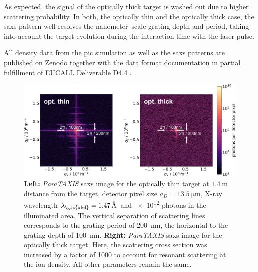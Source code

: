 As expected, the signal of the optically thick target is washed out due to
higher scattering probability. In both, the optically thin and the optically
thick case, the
\gls{saxs} pattern well resolves the nanometer--scale grating depth and period, taking
into account the target evolution during the interaction time with the laser
pulse.

All density data from the \gls{pic} simulation as well as the \gls{saxs} patterns are
published on Zenodo together with the data format documentation
\cite{Garten2017.zenodo.885033} in partial fulfillment of EUCALL Deliverable D4.4
\cite{EUCALL_SIMEX_D4.4}.

\begin{figure}
\centering
  \includegraphics[width=.99\linewidth]{figures/scattering_images_v2.png}
\caption{
\textbf{Left:} \textit{ParaTAXIS} \gls{saxs} image for the optically thin target at
$\SI{1.4}{\metre}$ distance from the target, detector pixel size $a_D =
\SI{13.5}{\micro\metre}$, X-ray wavelength $\lambda_\mathrm{\gls{xfel}} =
\SI{1.47}{\angstrom}$ and
\num{e12} photons in the illuminated area. The vertical separation of scattering
lines corresponds to the grating period of \SI{200}{\nano\metre}, the horizontal to
the grating depth of \SI{100}{\nano\metre}.
\textbf{Right:} \textit{ParaTAXIS} \gls{saxs} image for the optically thick target. Here, the
scattering cross section was increased by a factor of \num{1000} to account for
resonant scattering at the ion density. All other parameters remain the same.  }
  \label{fig:scattering}
\end{figure}



